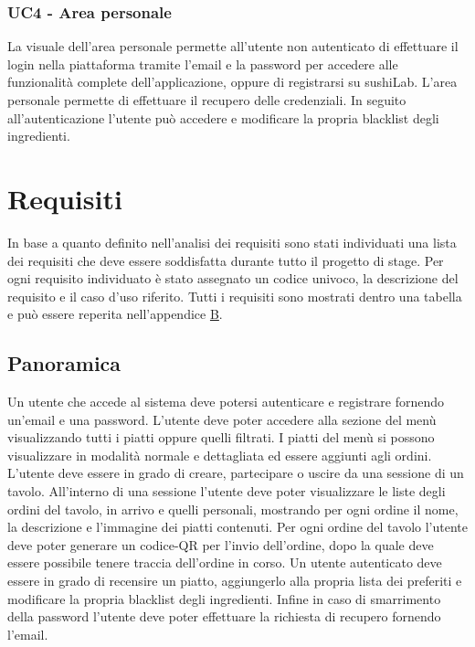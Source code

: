 \subsubsection{UC4 - Area personale}
La visuale dell'area personale permette all'utente non autenticato di effettuare il login nella piattaforma tramite l'email e la password per accedere alle funzionalità complete dell'applicazione, oppure di registrarsi su sushiLab. L'area personale permette di effettuare il recupero delle credenziali. In seguito all'autenticazione l'utente può accedere e modificare la propria blacklist degli ingredienti.
\section{Requisiti}
In base a quanto definito nell'analisi dei requisiti sono stati individuati una lista dei requisiti che deve essere soddisfatta durante tutto il progetto di stage. Per ogni requisito individuato è stato assegnato un codice univoco, la descrizione del requisito e il caso d'uso riferito. Tutti i requisiti sono mostrati dentro una tabella e può essere reperita nell'appendice {\hyperref[cap:appendice b]{B}}.
\subsection{Panoramica}
Un utente che accede al sistema deve potersi autenticare e registrare fornendo un'email e una password.
L'utente deve poter accedere alla sezione del menù visualizzando tutti i piatti oppure quelli filtrati. I piatti del menù si possono visualizzare in modalità normale e dettagliata ed essere aggiunti agli ordini. L'utente deve essere in grado di creare, partecipare o uscire da una sessione di un tavolo. All'interno di una sessione l'utente deve poter visualizzare le liste degli ordini del tavolo, in arrivo e quelli personali, mostrando per ogni ordine il nome, la descrizione e l'immagine dei piatti contenuti. Per ogni ordine del tavolo l'utente deve poter generare un codice-QR per l'invio dell'ordine, dopo la quale deve essere possibile tenere traccia dell'ordine in corso. Un utente autenticato deve essere in grado di recensire un piatto, aggiungerlo alla propria lista dei preferiti e modificare la propria blacklist degli ingredienti. Infine in caso di smarrimento della password l'utente deve poter effettuare la richiesta di recupero fornendo l'email.